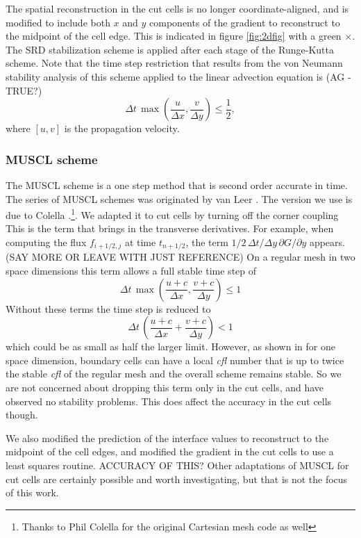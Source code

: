 The spatial reconstruction in the cut cells is no longer
coordinate-aligned, and is modified
to include both $x$ and $y$ components of the gradient to 
reconstruct to the midpoint of the cell edge. This is indicated 
in figure \ref{fig:2dfig}  with a green $\times$.
The SRD stabilization scheme is applied after each stage of
the Runge-Kutta scheme. 
Note that the time step restriction that results from the von Neumann stability analysis of this scheme applied to the linear advection equation is  (AG -
TRUE?)
\begin{equation}
\Delta t \,  \max\left(\frac{u}{\Delta x},\frac{v}{\Delta y}\right) \leq \frac{1}{2} ,
\end{equation}
where $[u,v]$ is the propagation velocity.  

\subsubsection{MUSCL scheme}
The MUSCL scheme is a one step method that is second order accurate in
time. The series of MUSCL schemes  was originated by van Leer 
\cite{vanleer:muscl}. The version we use 
is due to Colella \cite{Colella:Unsplit}.\footnote{Thanks to Phil 
Colella for the original Cartesian mesh code as well}.
We adapted it to cut cells by turning off the corner coupling 
This is the term that brings in the transverse derivatives. For example,
when computing the flux $f_{i+1/2,j}$ at time $t_{n+1/2}$, the 
term $ 1/2 \, \Delta t/\Delta y \, \partial G / \partial y$
appears.
(SAY MORE OR LEAVE WITH JUST REFERENCE)
On a regular mesh in  two space dimensions this term allows a full stable time step of 
\begin{equation}
\Delta t \,  \max \left(\frac{u+c}{\Delta x},\frac{v+c}{\Delta y}\right) \leq 1
\end{equation}
Without these terms the time step is reduced to 
\begin{equation}
\Delta t \, \left (\frac{u+c}{\Delta x} + \frac{v+c}{\Delta y} \right) < 1
\end{equation}
which could be as small as half the larger limit.
However, as shown in \cite{mjb:stability2} for one space dimension, 
boundary cells can have
a local {\em cfl} number that is up to twice the stable {\em cfl} of the regular
mesh and the overall scheme remains stable. So we are not concerned
about dropping this term only in the cut cells, and have observed no
stability problems. This does affect the accuracy in the cut cells
though. 

We also modified the prediction of the interface values to reconstruct
to the midpoint of the cell edges, and
modified the gradient in the cut cells to use a least squares routine.
ACCURACY OF THIS?
Other adaptations of MUSCL for cut cells are certainly possible and
worth investigating, but that is not the focus of this work.


